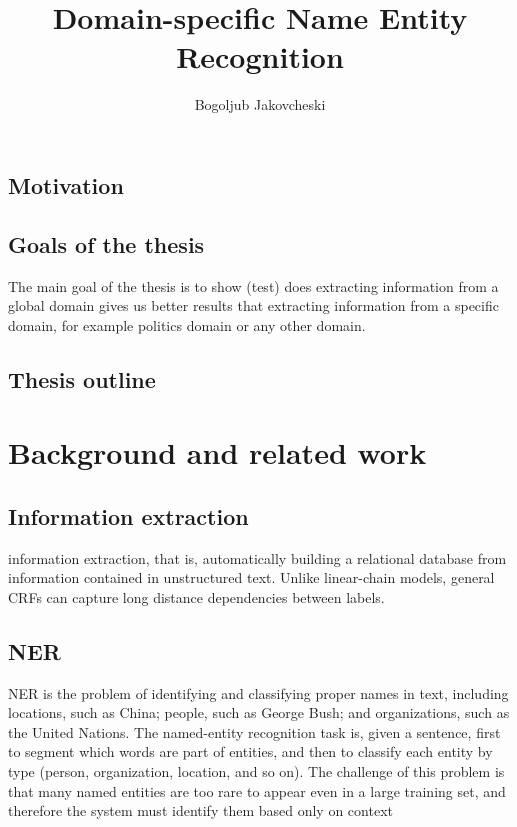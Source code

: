 \documentclass[thesis=M,english]{FITthesis}[2018/05/30]
\title{Domain-specific Name Entity Recognition}
\author{Bogoljub Jakovcheski} %
\begin{document}

\begin{introduction}

\section{Motivation}

\section{Goals of the thesis}
	The main goal of the thesis is to show (test) does extracting information from a global domain gives us better results that extracting information from a specific domain, for example politics domain or any other domain.
\section{Thesis outline}
	

\end{introduction}

\chapter{Background and related work}\label{}

	

\section{Information extraction}
information extraction, that is, automatically building a relational database from information contained in unstructured text. Unlike linear-chain models, general CRFs can capture long distance dependencies between labels. 

\section{NER}
NER is the problem of identifying and classifying proper names in text, including locations, such as China; people, such as George Bush; and organizations, such as the United Nations. The named-entity recognition task is, given a sentence, first to segment which words are part of entities, and then to classify each entity by type (person, organization, location, and so on). The challenge of this problem is that many named entities are too rare to appear even in a large training set, and therefore the system must identify them based only on context
\end{document}
